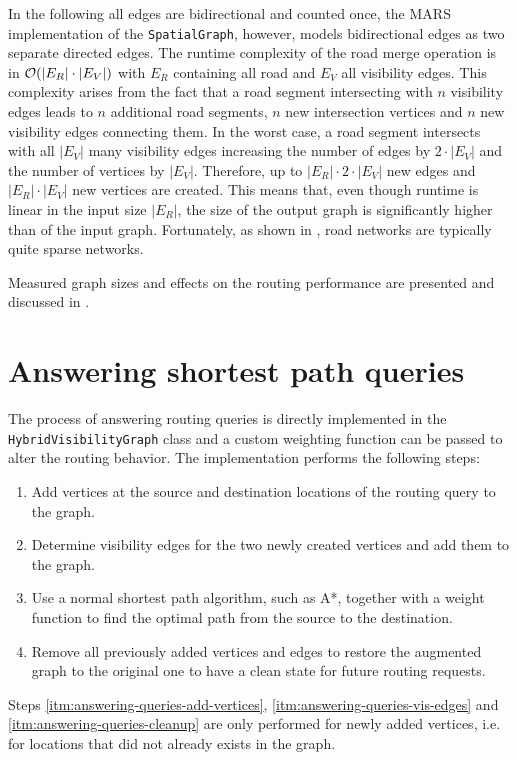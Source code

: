 		In the following all edges are bidirectional and counted once, the MARS implementation of the \texttt{SpatialGraph}, however, models bidirectional edges as two separate directed edges.
		The runtime complexity of the road merge operation is in $\mathcal{O}(|E_R| \cdot |E_V|)$ with $E_R$ containing all road and $E_V$ all visibility edges.
		This complexity arises from the fact that a road segment intersecting with $n$ visibility edges leads to $n$ additional road segments, $n$ new intersection vertices and $n$ new visibility edges connecting them.
		In the worst case, a road segment intersects with all $|E_V|$ many visibility edges increasing the number of edges by $2 \cdot |E_V|$ and the number of vertices by $|E_V|$.
		Therefore, up to $|E_R| \cdot 2 \cdot |E_V|$ new edges and $|E_R| \cdot |E_V|$ new vertices are created.
		This means that, even though runtime is linear in the input size $|E_R|$, the size of the output graph is significantly higher than of the input graph.
		Fortunately, as shown in , road networks are typically quite sparse networks.

		Measured graph sizes and effects on the routing performance are presented and discussed in .
	
\section{Answering shortest path queries}
\label{sec:answering-queries}

	The process of answering routing queries is directly implemented in the \texttt{HybridVisibilityGraph} class and a custom weighting function can be passed to alter the routing behavior.
	The implementation performs the following steps:
	\begin{enumerate}
		\item \label{itm:answering-queries-add-vertices} Add vertices at the source and destination locations of the routing query to the graph.
		\item \label{itm:answering-queries-vis-edges} Determine visibility edges for the two newly created vertices and add them to the graph.
		\item \label{itm:answering-queries-routing} Use a normal shortest path algorithm, such as A*, together with a weight function to find the optimal path from the source to the destination.
		\item \label{itm:answering-queries-cleanup} Remove all previously added vertices and edges to restore the augmented graph to the original one to have a clean state for future routing requests.
	\end{enumerate}
	Steps \ref{itm:answering-queries-add-vertices}, \ref{itm:answering-queries-vis-edges} and \ref{itm:answering-queries-cleanup} are only performed for newly added vertices, i.e. for locations that did not already exists in the graph.
	
